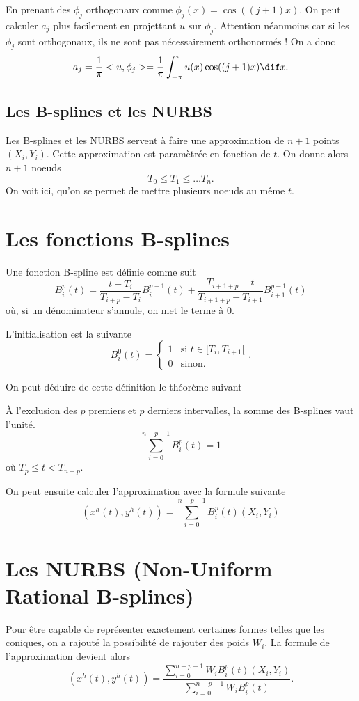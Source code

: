 En prenant des $\phi_j$ orthogonaux comme $\phi_j(x) = \cos((j+1)x)$.
On peut calculer $a_j$ plus facilement en projettant $u$ sur $\phi_j$.
Attention néanmoins car si les $\phi_j$ sont orthogonaux,
ils ne sont pas nécessairement orthonormés !
On a donc
\[ a_j = \frac{1}{\pi} <u, \phi_j> =
\frac{1}{\pi} \int_{-\pi}^{\pi} u(x) \cos((j+1)x) \dif x. \]

\subsection{Les B-splines et les NURBS}
Les B-splines et les NURBS servent à faire une approximation
de $n+1$ points $(X_i, Y_i)$.
Cette approximation est paramètrée en fonction de $t$.
On donne alors $n+1$ noeuds
\[ T_0 \leq T_1 \leq \ldots T_n. \]
On voit ici, qu'on se permet de mettre plusieurs noeuds au même $t$.

\section{Les fonctions B-splines}
Une fonction B-spline est définie comme suit
\[ B_i^p(t) = \frac{t-T_i}{T_{i+p}-T_i} B_i^{p-1}(t)
+ \frac{T_{i+1+p} - t}{T_{i+1+p} - T_{i+1}}B_{i+1}^{p-1}(t) \]
où, si un dénominateur s'annule, on met le terme à 0.

L'initialisation est la suivante
\[ B_i^0(t) = \left\{\begin{array}{ll}
1 & \text{si }t \in [T_i, T_{i+1}[\\
0 & \text{sinon.}\end{array}\right.. \]

On peut déduire de cette définition le théorème suivant
\begin{mytheo}
  \label{thm:sumbspline1}
  À l'exclusion des $p$ premiers et $p$ derniers intervalles,
  la somme des B-splines vaut l'unité.
  \[ \sum_{i=0}^{n-p-1} B_i^p(t) = 1 \]
  où $T_p \leq t < T_{n-p}$.
\end{mytheo}

On peut ensuite calculer l'approximation avec la formule suivante
\[ (x^h(t), y^h(t)) = \sum_{i=0}^{n-p-1} B_i^p(t) (X_i, Y_i) \]

\section{Les NURBS (Non-Uniform Rational B-splines)}
Pour être capable de représenter exactement certaines formes telles
que les coniques, on a rajouté la possibilité de rajouter des poids $W_i$.
La formule de l'approximation devient alors
\[ (x^h(t), y^h(t)) =
\frac{\sum_{i=0}^{n-p-1}W_iB_i^p(t)(X_i, Y_i)}
{\sum_{i=0}^{n-p-1}W_iB_i^p(t)}. \]

